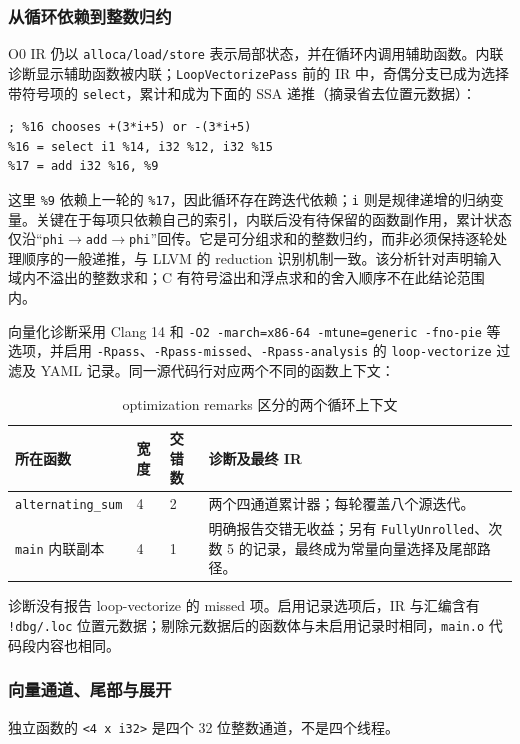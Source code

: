 \subsubsection{从循环依赖到整数归约}
\label{sec:toolchain-reduction}
O0 IR 仍以 \texttt{alloca/load/store} 表示局部状态，并在循环内调用辅助函数。内联诊断显示辅助函数被内联；\texttt{LoopVectorizePass} 前的 IR 中，奇偶分支已成为选择带符号项的 \texttt{select}，累计和成为下面的 SSA 递推（摘录省去位置元数据）：
\begin{lstlisting}[caption={向量化前的归约环；数值名来自 pass 前 IR}]
%9 = phi i32 [ %17, %8 ], [ 0, %3 ]
; %16 chooses +(3*i+5) or -(3*i+5)
%16 = select i1 %14, i32 %12, i32 %15
%17 = add i32 %16, %9
\end{lstlisting}
这里 \texttt{\%9} 依赖上一轮的 \texttt{\%17}，因此循环存在跨迭代依赖；\texttt{i} 则是规律递增的归纳变量。关键在于每项只依赖自己的索引，内联后没有待保留的函数副作用，累计状态仅沿“\texttt{phi}$\to$\texttt{add}$\to$\texttt{phi}”回传。它是可分组求和的整数归约，而非必须保持逐轮处理顺序的一般递推，与 LLVM 的 reduction 识别机制一致\cite{llvmvector14}。该分析针对声明输入域内不溢出的整数求和；C 有符号溢出和浮点求和的舍入顺序不在此结论范围内。

向量化诊断采用 Clang 14 和 \texttt{-O2 -march=x86-64 -mtune=generic -fno-pie} 等选项，并启用 \texttt{-Rpass}、\texttt{-Rpass-missed}、\texttt{-Rpass-analysis} 的 \texttt{loop-vectorize} 过滤及 YAML 记录\cite{clangremarks14}。同一源代码行对应两个不同的函数上下文：
\begin{table}[H]
\centering\small
\caption{optimization remarks 区分的两个循环上下文}
\label{tab:vector-remarks}
\begin{tabularx}{\textwidth}{L{3.1cm}L{1.1cm}L{1.1cm}Y}
\toprule{}所在函数 & 宽度 & 交错数 & 诊断及最终 IR \\
\midrule
\texttt{alternating\_sum} & 4 & 2 & 两个四通道累计器；每轮覆盖八个源迭代。\\
\texttt{main} 内联副本 & 4 & 1 & 明确报告交错无收益；另有 \texttt{FullyUnrolled}、次数 5 的记录，最终成为常量向量选择及尾部路径。\\
\bottomrule
\end{tabularx}
\end{table}
诊断没有报告 loop-vectorize 的 missed 项。启用记录选项后，IR 与汇编含有 \texttt{!dbg/.loc} 位置元数据；剔除元数据后的函数体与未启用记录时相同，\texttt{main.o} 代码段内容也相同。

\subsubsection{向量通道、尾部与展开}
\label{sec:toolchain-vector-tail}
独立函数的 \texttt{<4 x i32>} 是四个 32 位整数通道，不是四个线程。

